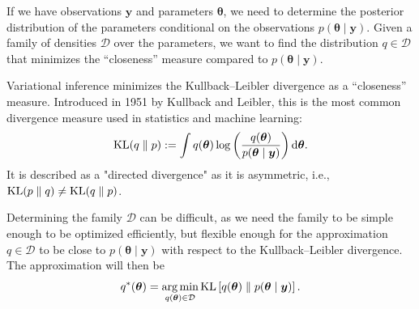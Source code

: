\documentclass[a4paper, 11pt]{report}
\numberwithin{equation}{chapter}
\DeclareMathOperator*{\argmin}{arg\,min}
\DeclareMathOperator*{\KL}{{\rm KL}}
\begin{document}
If we have observations $\boldsymbol{y}$ and parameters $\boldsymbol{\theta}$, we need to determine the posterior distribution of the parameters conditional on the observations $p(\boldsymbol{\theta} \mid \boldsymbol{y})$. Given a family of densities $\mathcal{D}$ over the parameters, we want to find the distribution $q \in \mathcal{D}$ that minimizes the ``closeness'' measure compared to $p(\boldsymbol{\theta} \mid \boldsymbol{y})$.

Variational inference minimizes the Kullback--Leibler divergence as a ``closeness'' measure. Introduced in 1951 by Kullback and Leibler\cite{kl51}, this is the most common divergence measure used in statistics and machine learning:
\begin{equation*}
\KL(q\parallel p) := \int q(\boldsymbol{\theta})\log \left(\frac{q(\boldsymbol{\theta})}{p(\boldsymbol{\theta} \mid \boldsymbol{y})}\right) \mathrm{d}\boldsymbol{\theta}.
\end{equation*} 
It is described as a "directed divergence" as it is asymmetric, i.e., $\KL(p\parallel q) \neq \KL(q \parallel p)$.

Determining the family $\mathcal{D}$ can be difficult, as we need the family to be simple enough to be optimized efficiently, but flexible enough for the approximation $q \in \mathcal{D}$ to be close to $p(\boldsymbol{\theta} \mid \boldsymbol{y})$ with respect to the Kullback--Leibler divergence. The approximation will then be
\begin{equation*}
q^*(\boldsymbol{\theta} ) = \argmin_{q(\boldsymbol{\theta}) \in \mathcal{D}} \KL\left[ q(\boldsymbol{\theta}) \parallel p(\boldsymbol{\theta} \mid \boldsymbol{y})\right].
\end{equation*}
\end{document}
